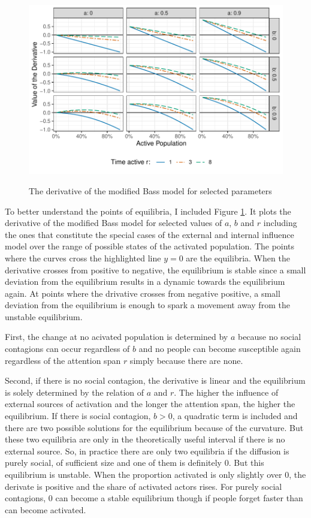\documentclass[a4paper,12pt]{article}
\begin{document}
\begin{figure}
\caption{The derivative of the modified Bass model for selected parameters}
\includegraphics[width=\linewidth]{images/equi_mod_bass.pdf}
\label{fig:equi_mod_bass}
\end{figure}

To better understand the points of equilibria, I included Figure \ref{fig:equi_mod_bass}. It plots the derivative of the modified Bass model for selected values of $a$, $b$ and $r$ including the ones that constitute the special cases of the external and internal influence model over the range of possible states of the activated population. The points where the curves cross the highlighted line $y = 0$ are the equilibria. When the derivative crosses from positive to negative, the equilibrium is stable since a small deviation from the equilibrium results in a dynamic towards the equilibrium again. At points where the drivative crosses from negative positive, a small deviation from the equilibrium is enough to spark a movement away from the unstable equilibrium.

First, the change at no acivated population is determined by $a$ because no social contagions can occur regardless of $b$ and no people can become susceptible again regardless of the attention span $r$ simply because there are none. 

Second, if there is no social contagion, the derivative is linear and the equilibrium is solely determined by the relation of $a$ and $r$. The higher the influence of external sources of activation and the longer the attention span, the higher the equilibrium.
If there is social contagion, $b > 0$, a quadratic term is included and there are two possible solutions for the equilibrium because of the curvature. But these two equilibria are only in the theoretically useful interval if there is no external source. So, in practice there are only two equilibria if the diffusion is purely social, of sufficient size and one of them is definitely 0. But this equilibrium is unstable. When the proportion activated is only slightly over 0, the derivate is positive and the share of activated actors rises. For purely social contagions, 0 can become a stable equilibrium though if people forget faster than can become activated.
\end{document}
